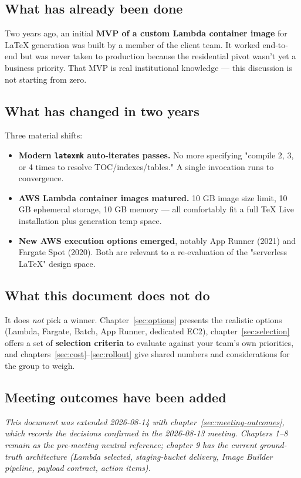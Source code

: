 \documentclass[11pt,letterpaper]{article}
\begin{document}
\subsection{What has already been done}
Two years ago, an initial \textbf{MVP of a custom Lambda container image} for LaTeX generation was built by a member of the client team. It worked end-to-end but was never taken to production because the residential pivot wasn't yet a business priority. That MVP is real institutional knowledge --- this discussion is not starting from zero.

\subsection{What has changed in two years}
Three material shifts:
\begin{itemize}[nosep]
  \item \textbf{Modern \texttt{latexmk} auto-iterates passes.} No more specifying "compile 2, 3, or 4 times to resolve TOC/indexes/tables." A single invocation runs to convergence.
  \item \textbf{AWS Lambda container images matured.} 10 GB image size limit, 10 GB ephemeral storage, 10 GB memory --- all comfortably fit a full TeX Live installation plus generation temp space.
  \item \textbf{New AWS execution options emerged}, notably App Runner (2021) and Fargate Spot (2020). Both are relevant to a re-evaluation of the "serverless LaTeX" design space.
\end{itemize}

\subsection{What this document does not do}
It does \emph{not} pick a winner. Chapter~\ref{sec:options} presents the realistic options (Lambda, Fargate, Batch, App Runner, dedicated EC2), chapter~\ref{sec:selection} offers a set of \textbf{selection criteria} to evaluate against your team's own priorities, and chapters~\ref{sec:cost}--\ref{sec:rollout} give shared numbers and considerations for the group to weigh.

\subsection{Meeting outcomes have been added}
\emph{This document was extended 2026-08-14 with chapter~\ref{sec:meeting-outcomes}, which records the decisions confirmed in the 2026-08-13 meeting. Chapters 1--8 remain as the pre-meeting neutral reference; chapter 9 has the current ground-truth architecture (Lambda selected, staging-bucket delivery, Image Builder pipeline, payload contract, action items).}
\end{document}
